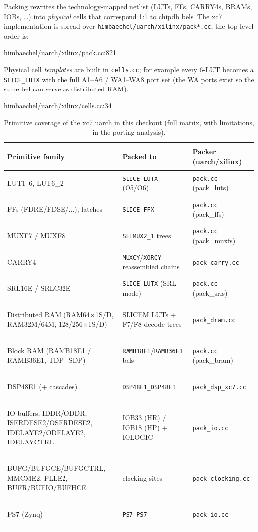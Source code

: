 \documentclass[11pt,a4paper]{article}
\begin{document}
Packing rewrites the technology-mapped netlist (LUTs, FFs, CARRY4s,
BRAMs, IOBs, \dots) into \emph{physical} cells that correspond 1:1 to
chipdb bels. The xc7 implementation is spread over
\texttt{himbaechel/\allowbreak uarch/\allowbreak xilinx/\allowbreak pack*.cc}; the top-level order is:

\begin{cppfile}{himbaechel/uarch/xilinx/pack.cc:821}
  
\end{cppfile}

Physical cell \emph{templates} are built in \texttt{cells.cc}; for
example every 6-LUT becomes a \texttt{SLICE\_LUTX} with the full A1--A6
/ WA1--WA8 port set (the WA ports exist so the same bel can serve as
distributed RAM):

\begin{cppfile}{himbaechel/uarch/xilinx/cells.cc:34}
  
\end{cppfile}

\begin{table}[htbp]
\centering
\small\sffamily
\begin{tabularx}{\textwidth}{>{\bfseries\color{accent1}\raggedright\arraybackslash}p{40mm} X >{\raggedright\arraybackslash}p{34mm}}
\toprule
Primitive family & Packed to & Packer (uarch/xilinx) \\
\midrule
LUT1--6, LUT6\_2 & \texttt{SLICE\_LUTX} (O5/O6) & \texttt{pack.cc} (pack\_luts) \\
FFs (FDRE/FDSE/$\dots$), latches & \texttt{SLICE\_FFX} & \texttt{pack.cc} (pack\_ffs) \\
MUXF7 / MUXF8 & \texttt{SELMUX2\_1} trees & \texttt{pack.cc} (pack\_muxfs) \\
CARRY4 & \texttt{MUXCY}/\texttt{XORCY} reassembled chains & \texttt{pack\_carry.cc} \\
SRL16E / SRLC32E & \texttt{SLICE\_LUTX} (SRL mode) & \texttt{pack.cc} (pack\_srls) \\
Distributed RAM (RAM64$\times$1S/D, RAM32M/64M, 128/256$\times$1S/D) & SLICEM LUTs + F7/F8 decode trees & \texttt{pack\_dram.cc} \\
Block RAM (RAMB18E1 / RAMB36E1, TDP+SDP) & \texttt{RAMB18E1}/\texttt{RAMB36E1} bels & \texttt{pack.cc} (pack\_bram) \\
DSP48E1 (+ cascades) & \texttt{DSP48E1\_DSP48E1} & \texttt{pack\_dsp\_xc7.cc} \\
IO buffers, IDDR/ODDR, ISERDESE2/OSERDESE2, IDELAYE2/ODELAYE2, IDELAYCTRL & IOB33 (HR) / IOB18 (HP) + IOLOGIC & \texttt{pack\_io.cc} \\
BUFG/BUFGCE/BUFGCTRL, MMCME2, PLLE2, BUFR/BUFIO/BUFHCE & clocking sites & \texttt{pack\_clocking.cc} \\
PS7 (Zynq) & \texttt{PS7\_PS7} & \texttt{pack\_io.cc} \\
\bottomrule
\end{tabularx}
\caption{Primitive coverage of the xc7 uarch in this checkout (full
matrix, with limitations, in the porting analysis).}
\end{table}
\end{document}
